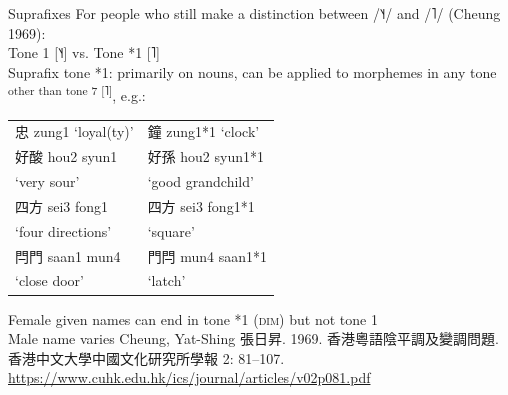 \documentclass{beamer}
\begin{document}
\begin{frame}[fragile]{Suprafixes}
For people who still make a distinction between /˥˧/ and /˥/ {\scriptsize (Cheung 1969)}:\\ 
\smallskip
Tone 1 [˥˧] vs. Tone *1 [˥]\\ 
Suprafix tone *1: primarily on nouns, can be applied to morphemes in any tone \textsuperscript{other than tone 7 [˥]}, e.g.:\\
\begin{table}
\flushleft
\begin{tabular}{l l}
    忠 zung1 \enquote*{loyal(ty)} & 鐘 zung1*1 \enquote*{clock}\\
    好酸 hou2 syun1 & 好孫 hou2 syun1*1\\
    \quad \enquote*{very sour} & \quad \enquote*{good grandchild}\\
    四方 sei3 fong1 & 四方 sei3 fong1*1\\
    \quad \enquote*{four directions} & \quad \enquote*{square}\\
    閂門 saan1 mun4 & 門閂 mun4 saan1*1\\
    \quad \enquote*{close door} & \quad \enquote*{latch}
\end{tabular}
\end{table}
Female given names can end in tone *1 (\textsc{dim}) but not tone 1\\ Male name varies
\vfill {} {\tiny Cheung, Yat-Shing 張日昇. 1969. 香港粵語陰平調及變調問題.  香港中文大學中國文化研究所學報 2: 81–107. \url{https://www.cuhk.edu.hk/ics/journal/articles/v02p081.pdf}}\par 
\end{frame}
\end{document}
